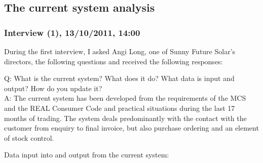 		\subsection{The current system analysis}
			\subsubsection{Interview (1), 13\slash 10\slash 2011, 14:00}
During the first interview, I asked Angi Long, one of Sunny Future Solar's directors, the following questions and received the following responses:

Q: What is the current system?  What does it do?  What data is input and output?  How do you update it?\\
A: The current system has been developed from the requirements of the MCS and the REAL Consumer Code and practical situations during the last 17 months of trading.  The system deals predominantly with the contact with the customer from enquiry to final invoice, but also purchase ordering and an element of stock control.

Data input into and output from the current system:

